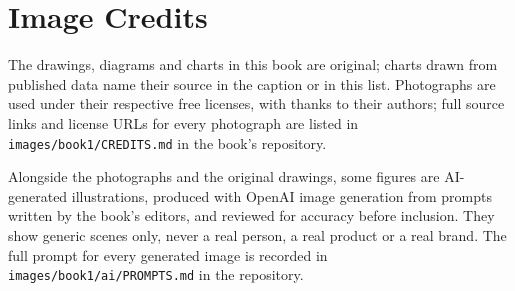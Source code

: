 \chapter*{Image Credits}

The drawings, diagrams and charts in this book are original; charts drawn
from published data name their source in the caption or in this list.
Photographs are used under their respective free licenses, with thanks to
their authors; full source links and license URLs for every photograph are
listed in \texttt{images/book1/CREDITS.md} in the book's repository.

\bigskip
Alongside the photographs and the original drawings, some figures are
AI-generated illustrations, produced with OpenAI image generation from
prompts written by the book's editors, and reviewed for accuracy before
inclusion. They show generic scenes only, never a real person, a real
product or a real brand. The full prompt for every generated image is
recorded in \texttt{images/book1/ai/PROMPTS.md} in the repository.

